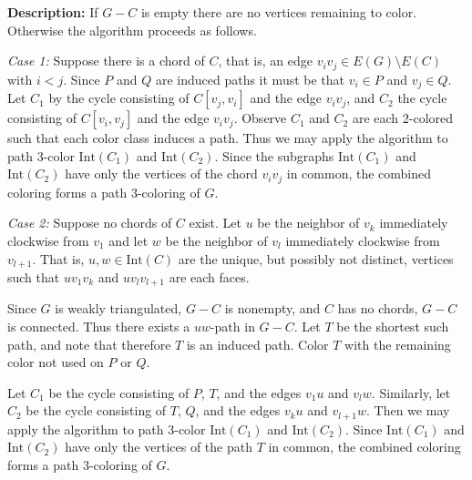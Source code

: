 \documentclass[letterpaper, 12pt]{article}
\theoremstyle{definition}
\theoremstyle{definition}
\theoremstyle{thm}
\theoremstyle{definition}
\begin{document}
\noindent\textbf{Description:} If $G-C$ is empty there are no vertices remaining
to color. Otherwise the algorithm proceeds as follows.

\textit{Case 1:} Suppose there is a chord of $C$, that is, an edge
$v_iv_j\in E(G)\setminus E(C)$
with $i<j$. Since $P$ and $Q$ are induced paths it must be that $v_i\in P$ and
$v_j\in Q$. Let $C_1$ by the cycle consisting of $C[v_j,v_i]$ and the
edge $v_iv_j$, and $C_2$ the cycle consisting of $C[v_i,v_j]$ and the edge
$v_iv_j$. Observe $C_1$ and $C_2$ are each $2$-colored
such that each color class induces a path. Thus we may apply the algorithm to
path $3$-color $\text{Int}(C_1)$ and $\text{Int}(C_2)$. Since the subgraphs
$\text{Int}(C_1)$ and $\text{Int}(C_2)$ have only the vertices of the chord
$v_iv_j$ in common, the combined coloring forms a path $3$-coloring of $G$.

\textit{Case 2:} Suppose no chords of $C$ exist. Let $u$ be the neighbor of
$v_k$ immediately clockwise from $v_1$ and let $w$ be the neighbor of $v_l$
immediately clockwise from $v_{l+1}$. That is, $u,w\in\text{Int}(C)$ are the
unique, but possibly not distinct, vertices such that $uv_1v_k$ and
$uv_lv_{l+1}$ are each faces.

Since $G$ is weakly triangulated, $G-C$ is nonempty,
and $C$ has no chords, $G-C$ is connected. Thus there exists a $uw$-path in
$G-C$. Let $T$ be the shortest such path, and note that therefore $T$ is
an induced path. Color $T$ with the remaining color not used on $P$ or $Q$.

Let $C_1$ be the cycle
consisting of $P$, $T$, and the edges $v_1u$ and $v_lw$. Similarly, let $C_2$ be
the cycle consisting of $T$, $Q$, and the edges $v_ku$ and $v_{l+1}w$. Then we
may apply the algorithm to path $3$-color $\text{Int}(C_1)$ and
$\text{Int}(C_2)$. Since $\text{Int}(C_1)$ and $\text{Int}(C_2)$ have only the
vertices of the path $T$ in common, the combined coloring forms a path
$3$-coloring of $G$.\\
\end{document}
